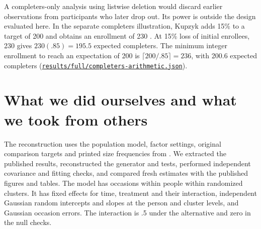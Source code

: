 A completers-only analysis using listwise deletion would discard earlier observations from participants who later drop out. Its power is outside the design evaluated here. In the separate completers illustration, Kupzyk adds 15\% to a target of 200 and obtains an enrollment of 230 \citep[p.~100]{kupzyk2011}. At 15\% loss of initial enrollees, 230 gives $230(.85)=195.5$ expected completers. The minimum integer enrollment to reach an expectation of 200 is $\lceil 200/.85\rceil=236$, with 200.6 expected completers (\href{https://github.com/alectionary/vibe-math/blob/master/formalization/kupzyk-power-assumptions/results/full/completers-arithmetic.json}{\nolinkurl{results/full/completers-arithmetic.json}}).
\label{dis:completer-inflation}

\section{What we did ourselves and what we took from others}\label{sec:design}
The reconstruction uses the population model, factor settings, original comparison targets and printed size frequencies from \citet[Chapters III--V and Appendices A--D]{kupzyk2011}. We extracted the published results, reconstructed the generator and tests, performed independent covariance and fitting checks, and compared fresh estimates with the published figures and tables. The model has occasions within people within randomized clusters. It has fixed effects for time, treatment and their interaction, independent Gaussian random intercepts and slopes at the person and cluster levels, and Gaussian occasion errors. The interaction is .5 under the alternative and zero in the null checks.

